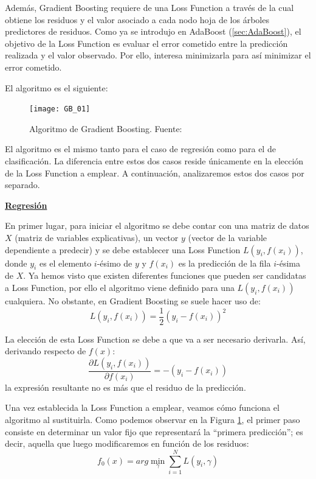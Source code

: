 \documentclass[12pt,twoside]{article}
\begin{document}
Además, Gradient Boosting requiere de una Loss Function a través de la cual obtiene los residuos y el valor asociado a cada nodo hoja de los árboles predictores de residuos. Como ya se introdujo en AdaBoost (\ref{sec:AdaBoost}), el objetivo de la Loss Function es evaluar el error cometido entre la predicción realizada y el valor observado. Por ello, interesa minimizarla para así minimizar el error cometido.

El algoritmo es el siguiente:

\begin{figure}[h]
\centering
\texttt{[image: GB\_01]}
\caption{Algoritmo de Gradient Boosting. Fuente: \cite{FR04}}
\label{fig:GB_01}
\end{figure}

El algoritmo es el mismo tanto para el caso de regresión como para el de clasificación. La diferencia entre estos dos casos reside únicamente en la elección de la Loss Function a emplear. A continuación, analizaremos estos dos casos por separado.

\bigskip \bigskip \bigskip

\textbf{\underline{Regresión}}

\bigskip

En primer lugar, para iniciar el algoritmo se debe contar con una matriz de datos $X$ (matriz de variables explicativas), un vector $y$ (vector de la variable dependiente a predecir) y se debe establecer una Loss Function $L(y_i, f(x_i))$, donde $y_i$ es el elemento $i$-ésimo de $y$ y $f(x_i)$ es la predicción de la fila $i$-ésima de $X$. Ya hemos visto que existen diferentes funciones que pueden ser candidatas a Loss Function, por ello el algoritmo viene definido para una $L(y_i, f(x_i))$ cualquiera. No obstante, en Gradient Boosting se suele hacer uso de:
\begin{equation*}
L(y_i, f(x_i)) = \frac{1}{2}(y_i - f(x_i))^2
\end{equation*}

La elección de esta Loss Function se debe a que va a ser necesario derivarla. Así, derivando respecto de $f(x)$:
\begin{equation*}
\frac{\partial L(y_i, f(x_i))}{\partial f(x_i)} = -(y_i -f(x_i))
\end{equation*}
\noindent
la expresión resultante no es más que el residuo de la predicción.

Una vez establecida la Loss Function a emplear, veamos cómo funciona el algoritmo al sustituirla. Como podemos observar en la Figura \ref{fig:GB_01}, el primer paso consiste en determinar un valor fijo que representará la ``primera predicción''; es decir, aquella que luego modificaremos en función de los residuos:
\begin{equation*}
f_0(x) = arg\min_{\gamma} \sum_{i=1}^N L(y_i, \gamma)
\end{equation*}
\end{document}
